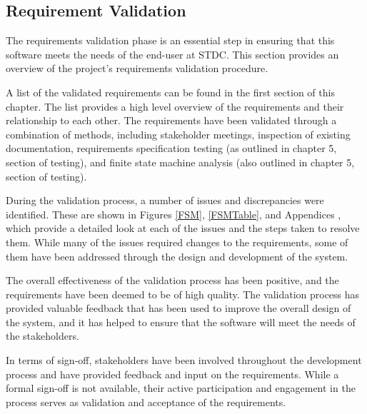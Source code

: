 \subsection{Requirement Validation}
\begin{justify}
\vspace{0.25cm}
The requirements validation phase is an essential step in ensuring that this software meets the needs of the end-user at STDC. This section provides an overview of the project's requirements validation procedure.

\vspace{0.25cm}
\newendline A list of the validated requirements can be found in the first section of this chapter. The list provides a high level overview of the requirements and their relationship to each other. The requirements have been validated through a combination of methods, including stakeholder meetings, inspection of existing documentation, requirements specification testing (as outlined in chapter 5, section of testing), and finite state machine analysis (also outlined in chapter 5, section of testing).

\vspace{0.25cm}
\newendline During the validation process, a number of issues and discrepancies were identified. These are shown in Figures \ref{FSM}, \ref{FSMTable}, and Appendices \pageref{Appendix 2}, which provide a detailed look at each of the issues and the steps taken to resolve them. While many of the issues required changes to the requirements, some of them have been addressed through the design and development of the system.

\vspace{0.25cm}
\newendline The overall effectiveness of the validation process has been positive, and the requirements have been deemed to be of high quality. The validation process has provided valuable feedback that has been used to improve the overall design of the system, and it has helped to ensure that the software will meet the needs of the stakeholders.

\vspace{0.25cm}
\newendline In terms of sign-off, stakeholders have been involved throughout the development process and have provided feedback and input on the requirements. While a formal sign-off is not available, their active participation and engagement in the process serves as validation and acceptance of the requirements.
\end{justify}



\clearpage
